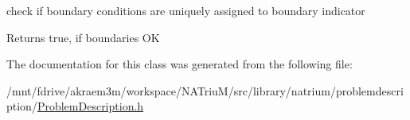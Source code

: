 check if boundary conditions are uniquely assigned to boundary indicator \begin{DoxyReturn}{Returns}
true, if boundaries OK 
\end{DoxyReturn}


The documentation for this class was generated from the following file:\begin{DoxyCompactItemize}
\item 
/mnt/fdrive/akraem3m/workspace/NATriuM/src/library/natrium/problemdescription/\hyperlink{ProblemDescription_8h}{ProblemDescription.h}\end{DoxyCompactItemize}
